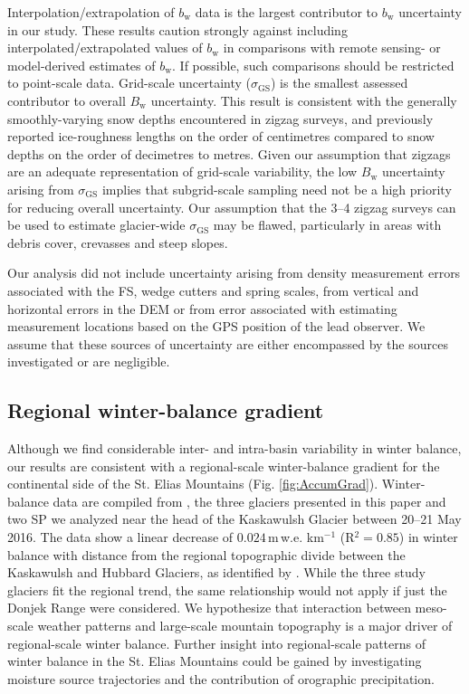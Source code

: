 \documentclass[review,oneside, letterpaper]{igs}
\begin{document}
Interpolation/extrapolation of $b_\mathrm{w}$ data is the largest contributor to $b_\mathrm{w}$ uncertainty in our study. These results caution strongly against including interpolated/extrapolated values of $b_\mathrm{w}$ in comparisons with remote sensing- or model-derived estimates of $b_\mathrm{w}$. If possible, such comparisons should be restricted to point-scale data. Grid-scale uncertainty ($\sigma_{\mathrm{GS}}$) is the smallest assessed contributor to overall $B_\mathrm{w}$ uncertainty. This result is consistent with the generally smoothly-varying snow depths encountered in zigzag surveys, and previously reported ice-roughness lengths on the order of centimetres \citep[e.g.][]{Hock2005} compared to snow depths on the order of decimetres to metres. Given our assumption that zigzags are an adequate representation of grid-scale variability, the low $B_\mathrm{w}$ uncertainty arising from $\sigma_{\mathrm{GS}}$ implies that subgrid-scale sampling need not be a high priority for reducing overall uncertainty. Our assumption that the 3--4 zigzag surveys can be used to estimate glacier-wide $\sigma_{\mathrm{GS}}$ may be flawed, particularly in areas with debris cover, crevasses and steep slopes.

Our analysis did not include uncertainty arising from density measurement errors associated with the FS, wedge cutters and spring scales, from vertical and horizontal errors in the DEM or from error associated with estimating measurement locations based on the GPS position of the lead observer. We assume that these sources of uncertainty are either encompassed by the sources investigated or are negligible.


\subsection{Regional winter-balance gradient}

Although we find considerable inter- and intra-basin variability in winter balance, our results are consistent with a regional-scale winter-balance gradient for the continental side of the St. Elias Mountains (Fig. \ref{fig:AccumGrad}). Winter-balance data are compiled from \cite{Taylor1969}, the three glaciers presented in this paper and two SP we analyzed near the head of the Kaskawulsh Glacier between 20--21 May 2016. The data show a linear decrease of $0.024$\,m\,w.e. km$^{-1}$ (R$^2=0.85$) in winter balance with distance from the regional topographic divide between the Kaskawulsh and Hubbard Glaciers, as identified by \cite{Taylor1969}. While the three study glaciers fit the regional trend, the same relationship would not apply if just the Donjek Range were considered. We hypothesize that interaction between meso-scale weather patterns and large-scale mountain topography is a major driver of regional-scale winter balance. Further insight into regional-scale patterns of winter balance in the St. Elias Mountains could be gained by investigating moisture source trajectories and the contribution of orographic precipitation. 
\end{document}
